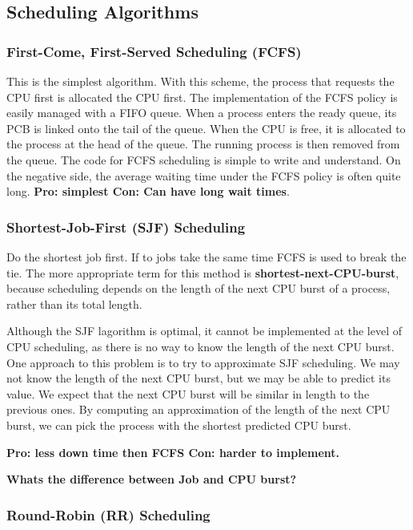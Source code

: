\documentclass{article}
\begin{document}
\subsection{Scheduling Algorithms}

\subsubsection{First-Come, First-Served Scheduling (FCFS)}
This is the simplest algorithm. With this scheme, the process that requests the
CPU first is allocated the CPU first. The implementation of the FCFS policy is
easily managed with a FIFO queue. When a process enters the ready queue, its
PCB is linked onto the tail of the queue. When the CPU is free, it is allocated to
the process at the head of the queue. The running process is then removed from
the queue. The code for FCFS scheduling is simple to write and understand.
On the negative side, the average waiting time under the FCFS policy is
often quite long. {\bf Pro: simplest Con: Can have long wait times}.

\subsubsection{Shortest-Job-First (SJF) Scheduling}
Do the shortest job first. If to jobs take the same time FCFS is used to break the tie.
The more appropriate term for this method is {\bf shortest-next-CPU-burst}, because scheduling depends on the length of the next CPU burst of
a process, rather than its total length. 


Although the SJF lagorithm is optimal, it cannot be implemented at the level of CPU scheduling, 
as there is no way to know the length of the next CPU burst.
One approach to this problem is to try to approximate SJF scheduling. We may
not know the length of the next CPU burst, but we may be able to predict its
value. We expect that the next CPU burst will be similar in length to the previous
ones. By computing an approximation of the length of the next CPU burst, we
can pick the process with the shortest predicted CPU burst.


{\bf Pro: less down time then FCFS Con: harder to implement.}

 
{\bf Whats the difference between Job and CPU burst?}


\subsubsection{Round-Robin (RR) Scheduling}
\end{document}
